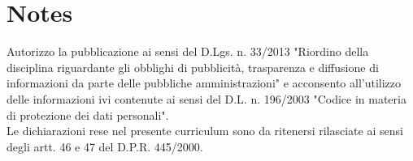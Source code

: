 \documentclass[11pt,a4paper,sans]{moderncv}
\begin{document}
  \section{Notes}
  Autorizzo la pubblicazione ai sensi del D.Lgs. n. 33/2013 "Riordino della disciplina riguardante gli obblighi di pubblicità, trasparenza e diffusione di informazioni da parte delle pubbliche amministrazioni" e acconsento all’utilizzo delle informazioni ivi contenute ai sensi del D.L. n. 196/2003 "Codice in materia di protezione dei dati personali". \\
  
  Le dichiarazioni rese nel presente curriculum sono da ritenersi rilasciate ai sensi degli artt. 46 e 47 del D.P.R. 445/2000.
  
\end{document}
